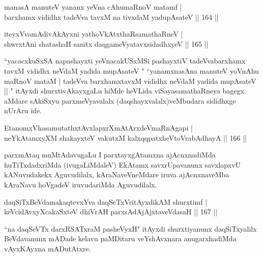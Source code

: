 \begin{shl}
manasA manuteV yananx yeVna cA\s \s humaRnoV matamf |\\
barxhamx vididhx tadeVva tavxM na tivxdaM yadupAsateV \hfill || 164 ||
\end{shl}

\begin{shl}
iteyxVvamAdivAkAyxni yathoVkAtxthaRsamathaRneV |\\
shwrxtAni shatashaH sanitx daqgameVyatavxsidadhxyeV \hfill || 165 ||
\end{shl}

\begin{artha}%
 ``yacacxkuSxSA napashayxti yeVnacakUSxMSi pashayxtiV tadeVvabarxhamx tavxM vididhx neVdaM yadida mupAsateV  " ``yanamxnasAna manuteV yoVnAhu maRnoV mataM | tadeVva barxhamxtavxM vididhx neVdaM yadida mupAsateV || " itAyxdi shurxtivAkayxgaLu hiMde heVLida viSayasamathaRneya bagegx. aMdare sAkiSxyu parxmeVyavalalx (daqshayxvalalx)veMbudara sididhxge nUrAru ide.
\end{artha}

\begin{shl}
EtanomxVhasamutathxtAvxlapxrXmAtArxdeVmaRnAgapi |\\
neYkAtamxyXM shakayxteV vakutxM kalxqqpatxheVtoVrabAdhayA \hfill || 166 ||
\end{shl}

\begin{artha}
parxmAtaq muMtAdavugaLu I parxtayxgAtamxna ajAcnxnadiMda huTiTxdadxriMda (ivugaLiMdaleV) EkAtamx savxrUpavanunx savxlapxvU kANuvudakekx Aguvudilalx, kAraNaveVneMdare iruva ajAcnxnaveMba kAraNavu hoVgadeV iruvudariMda Aguvudilalx. 
\end{artha}


\begin{shl}
daqSiTxBeVdamakaqtevxYva daqSeTxVritAyxdikAM shurxtimf |\\
keVcidAvxyXcakaSxteV dhiVrAH parxsAdAjAjxtaveVdasaH \hfill || 167 ||
\end{shl}

\begin{artha}
``na daqSeVTx darxRSATxraM pasheVyxH" itAyxdi shurxtiyanunx daqSiTxyalilx BeVdavanunx mADade kelavu paMDitaru veYshAvxnara anugarxhadiMda vAyxKAyxna mADutAtxre.
\end{artha}%



